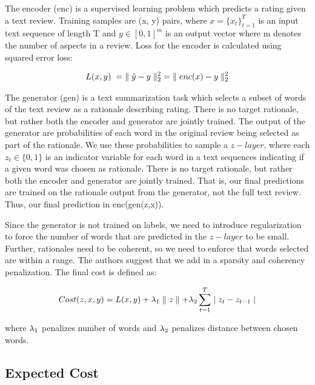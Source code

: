 \documentclass{article} %
\begin{document}
The encoder (enc) is a supervised learning problem which predicts a rating given
a text review. Training samples are (x, y) pairs,  where $x = \{x_t\}_{t=1}^T$
is an input text sequence of length T and $y \in [0, 1]^m$ is an output vector
where m denotes the number of aspects in a review. Loss for the encoder is
calculated using squared error loss:

\begin{gather}
L(x,y)\hspace{1mm} = 
\hspace{1mm}\parallel\hat{y} - y\parallel _2^2  \hspace{1mm} = 
\hspace{1mm}\parallel enc(x) - y\parallel _2^2
\end{gather}

The generator (gen) is a text summarization task which selects a subset of words
of the text review as a rationale describing rating. There is no target
rationale, but rather both the encoder and generator are jointly trained. The
output of the generator are probabilities of each word in the original review
being selected as part of the rationale. We use these probabilities to sample a
$z-layer$, where each $z_t \in \{0, 1\}$ is an indicator variable for each word
in a text sequences indicating if a given word was chosen as rationale. There is
no target rationale, but rather both the encoder and generator are jointly
trained. That is, our final predictions are trained on the rationale output from
the generator, not the full text review. Thus, our final prediction in
enc(gen(z,x)).

Since the generator is not trained on labels, we need to introduce
regularization to force the number of words that are predicted in the $z-layer$
to be small. Further, rationales need to be coherent, so we need to enforce that
words selected are within a range. The authors suggest that we add in a sparsity
and coherency penalization. The final cost is defined as:

\begin{gather}
Cost(z,x,y) = 
L(x,y) + \lambda \textsubscript{1} \parallel z \parallel + 
\lambda \textsubscript{2} \sum_{t = 1}^{T}  \mid z_t - z_{t-1} \mid
\end{gather}

where $\lambda \textsubscript{1}$ penalizes number of words and $\lambda
\textsubscript{2}$ penalizes distance between chosen words.

\subsection{Expected Cost}
\end{document}
